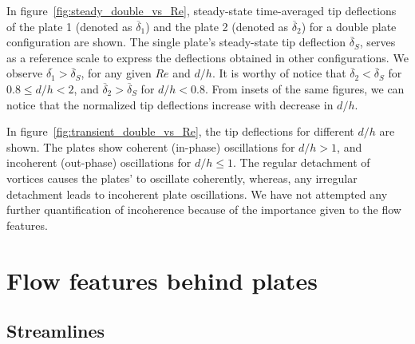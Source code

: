 \documentclass[aps,pre,twocolumn,aps,longbibliography]{revtex4-1}
\begin{document}
	In figure~\ref{fig:steady_double_vs_Re}, steady-state time-averaged tip deflections of the plate 1 (denoted as $\overline{\delta}_1$) and the plate 2 (denoted as $\overline{\delta}_2$) for a double plate configuration are shown. The single plate's steady-state tip deflection $\overline{\delta}_S$, serves as a reference scale to express the deflections obtained in other configurations. We observe $\overline{\delta_1}>\overline{\delta}_S$, for any given $Re$ and $d/h$. It is worthy of notice that $\overline{\delta}_2 < \overline{\delta}_S$ for $0.8\le d/h<2$, and $\overline{\delta}_2>\overline{\delta}_S$ for $d/h<0.8$. From insets of the same figures, we can notice that the normalized tip deflections increase with decrease in $d/h$.
	
	In figure~\ref{fig:transient_double_vs_Re}, the tip deflections for different $d/h$ are shown. The plates show coherent (in-phase) oscillations for $d/h>1$, and incoherent (out-phase) oscillations for $d/h\le1$. The regular detachment of vortices causes the plates' to oscillate coherently, whereas, any irregular detachment leads to incoherent plate oscillations. We have not attempted any further quantification of incoherence because of the importance given to the flow features.
	
	
	\section{Flow features behind plates}
	
	
	\subsection{Streamlines}
	
\end{document}
